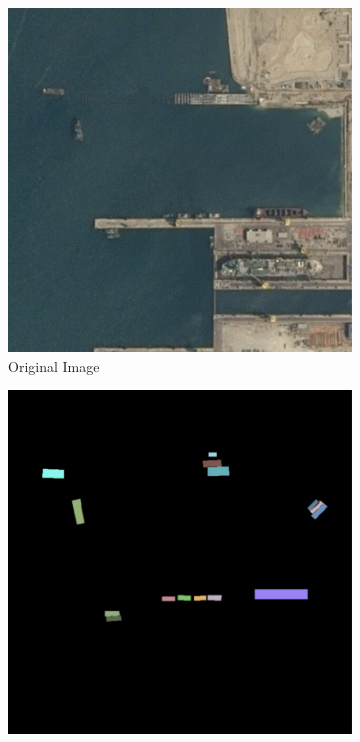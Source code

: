 \begin{figure}
    \newcommand{\CategoricalAccuracyImageWidth}{0.3\textwidth}

    \centering
    \hfill
    \begin{subfigure}{\CategoricalAccuracyImageWidth}
        \includegraphics[width=\textwidth]{images/categorical_accuracy_image}
        \caption{Original Image}
        \label{fig:ca_image}
    \end{subfigure}
    \hfill
    \begin{subfigure}{\CategoricalAccuracyImageWidth}
        \includegraphics[width=\textwidth]{images/categorical_accuracy_label}

\end{subfigure}
\end{figure}
